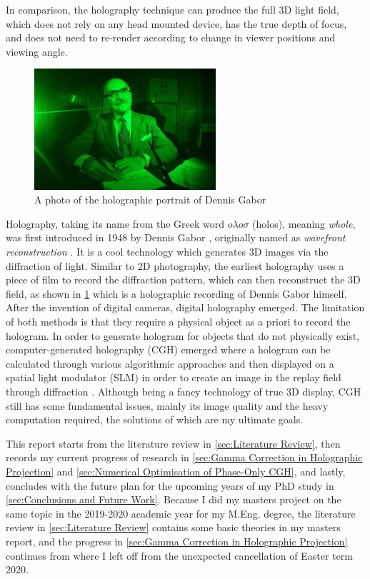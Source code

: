 In comparison, the holography technique can produce the full 3D light field, which does not rely on any head mounted device, has the true depth of focus, and does not need to re-render according to change in viewer positions and viewing angle.

\begin{figure}[H]
    \centering
    \includegraphics[width=0.6\textwidth]{Dennis-Gabor-Hologram-2.jpg}
    \caption{A photo of the holographic portrait of Dennis Gabor \cite{Lo2018}}\label{fig:Dennis-Gabor-Hologram-2}
\end{figure}

Holography, taking its name from the Greek word $o \lambda o \sigma $ (holos), meaning \textit{whole}, was first introduced in 1948 by Dennis Gabor \cite{Gabor1948}, originally named as \textit{wavefront reconstruction} \cite{Hecht2017}. It is a cool technology which generates 3D images via the diffraction of light. Similar to 2D photography, the earliest holography uses a piece of film to record the diffraction pattern, which can then reconstruct the 3D field, as shown in \cref{fig:Dennis-Gabor-Hologram-2} which is a holographic recording of Dennis Gabor himself. After the invention of digital cameras, digital holography emerged. The limitation of both methods is that they require a physical object as a priori to record the hologram. In order to generate hologram for objects that do not physically exist, computer-generated holography (CGH) emerged where a hologram can be calculated through various algorithmic approaches and then displayed on a spatial light modulator (SLM) in order to create an image in the replay field through diffraction \cite{Cable2006,Seldowitz1987,Yang2009,Gerchberg1972}. Although being a fancy technology of true 3D display, CGH still has some fundamental issues, mainly its image quality and the heavy computation required, the solutions of which are my ultimate goals.

This report starts from the literature review in \cref{sec:Literature Review}, then records my current progress of research in \cref{sec:Gamma Correction in Holographic Projection} and \cref{sec:Numerical Optimisation of Phase-Only CGH}, and lastly, concludes with the future plan for the upcoming years of my PhD study in \cref{sec:Conclusions and Future Work}. Because I did my masters project on the same topic in the 2019-2020 academic year for my M.Eng. degree, the literature review in \cref{sec:Literature Review} contains some basic theories in my masters report, and the progress in \cref{sec:Gamma Correction in Holographic Projection} continues from where I left off from the unexpected cancellation of Easter term 2020.